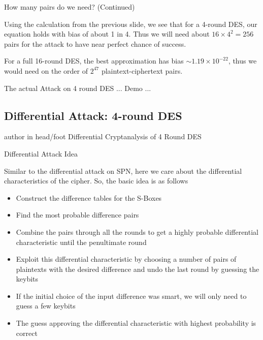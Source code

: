 \documentclass[9pt]{beamer}
\begin{document}
\begin{frame}
How many pairs do we need? (Continued)

\vspace{3mm}
Using the calculation from the previous slide, we see that for a 4-round DES, our equation holds with bias of about 1 in 4. \pause Thus we will need about $16\times 4^2 = 256$ pairs for the attack to have near perfect chance of success.

\vspace{3mm}
\pause For a full 16-round DES, the best approximation has bias $\sim 1.19\times 10^{-22}$, thus we would need on the order of $2^{47}$ plaintext-ciphertext pairs.
\end{frame}

\begin{frame}
The actual Attack on 4 round DES ... Demo ...
\end{frame}


\subsection{Differential Attack: 4-round DES}
\begin{frame}
\begin{beamercolorbox}[ht=2.5ex,dp=1.125ex,center,rounded=true,shadow=true]{author in head/foot}
Differential Cryptanalysis of 4 Round DES
\end{beamercolorbox}
\end{frame}

\begin{frame}
Differential Attack Idea

\vspace{5mm}
Similar to the differential attack on SPN, here we care about the differential characteristics of the cipher. \pause So, the basic idea is as follows

\begin{itemize}[<+->]
\item{Construct the difference tables for the S-Boxes}
\item{Find the most probable difference pairs}
\item{Combine the pairs through all the rounds to get a highly probable differential characteristic until the penultimate round}
\item{Exploit this differential characteristic by choosing a number of pairs of plaintexts with the desired difference and undo the last round by guessing the keybits}
\item{If the initial choice of the input difference was smart, we will only need to guess a few keybits}
\item{The guess approving the differential characteristic with highest probability is correct}
\end{itemize}

\end{frame}
\end{document}
